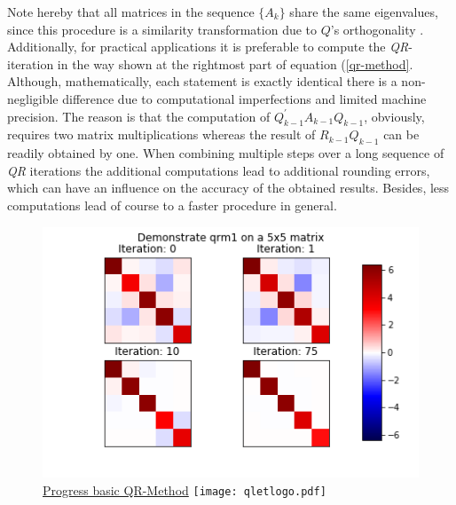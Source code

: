 \documentclass[12pt]{article}
\begin{document}
Note hereby that all matrices in the sequence $\{A_k\}$ share the same eigenvalues, since this procedure is a similarity transformation due to $Q$'s orthogonality \citep[p. 121]{NME}. Additionally, for practical applications it is preferable to compute the \textit{QR}-iteration in the way shown at the rightmost part of equation (\ref{qr-method}. Although, mathematically, each statement is exactly identical there is a non-negligible difference due to computational imperfections and limited machine precision. The reason is that the computation of $Q_{k-1}^{\prime} A_{k-1} Q_{k-1}$, obviously, requires two matrix multiplications whereas the result of $R_{k-1}Q_{k-1}$ can be readily obtained by one. When combining multiple steps over a long sequence of \textit{QR} iterations the additional computations lead to additional rounding errors, which can have an influence on the accuracy of the obtained results. Besides, less computations lead of course to a faster procedure in general.

\begin{figure}
\begin{center}
\label{qrm1-plot}
\caption{\href {https://github.com/thsis/NIS18/tree/master/media/plots}{Progress basic QR-Method}  \protect\texttt{[image: qletlogo.pdf]}}
  \includegraphics[scale=0.6]{../media/plots/qrm1.png}
\end{center}
\end{figure}
\end{document}
